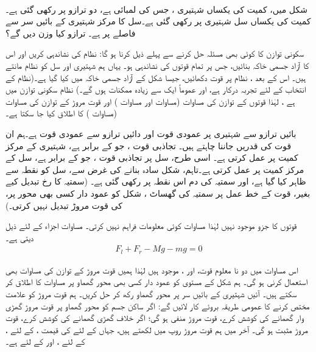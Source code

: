 \\
شکل  میں، کمیت  کی یکساں  شہتیری ، جس کی لمبائی  ہے، دو ترازو پر رکھی گئی ہے۔ کمیت   کی یکساں سل شہتیری پر رکھی گئی ہے۔سل کا مرکز شہتیری کے  بائیں سر سے   فاصلے پر ہے۔ ترازو کیا وزن دیں گے؟

سکونی توازن کا کوئی بھی مسئلہ حل کرنے سے پہلے ذیل کرنا ہو گا: نظام کی نشاندہی  کریں اور اس کا آزاد جسمی  خاکہ بنائیں، جس پر تمام قوتوں  کی نشاندہی   ہو۔ یہاں ہم شہتیری اور سل کو  نظام مانتے ہیں۔ اس کے بعد ، نظام پر قوت دکھائیں، جیسا شکل   کے آزاد جسمی خاکہ میں کیا گیا ہے۔(نظام کے  انتخاب کے لئے تجربہ درکار ہے، اور عموماً ایک سے زیادہ  ممکنات ہوں گے۔) نظام سکونی توازن میں ہے ، لہٰذا قوتوں کے توازن  کی مساوات  (مساوات  اور مساوات ) اور قوت مروڑ کے توازن کی مساوات (مساوات ) کا اطلاق کیا جا سکتا ہے۔

\quad
بائیں ترازو سے شہتیری پر عمودی قوت  اور  دائیں ترازو سے عمودی  قوت   ہے۔ہم ان قوت کی قدریں جاننا چاہتے ہیں۔ تجاذبی قوت ،    جو   کے برابر ہے، شہتیری  کے مرکز کمیت پر عمل کرتی ہے۔ اسی طرح،  سل  پر تجاذبی قوت ، جو  کے برابر ہے، سل کے مرکز کمیت پر عمل کرتی ہے۔تاہم،  شکل  سادہ بنانے کی غرض سے، سل کو نقطہ سے ظاہر کیا گیا ہے، اور سمتیہ   کی دم اس نقطہ پر رکھی گئی ہے۔ (سمتیہ   کا رخ تبدیل کیے بغیر،  قوت کے خط عمل پر سمتیہ   کی  گھساٹ ، شکل کو عمود دار کسی بھی محور پر،   کی قوت مروڑ تبدیل نہیں کرتی۔)

قوتوں کا  جزو موجود نہیں لہٰذا  مساوات    کوئی معلومات فراہم نہیں کرتی۔ مساوات       اجزاء کے لئے ذیل دیتی ہے۔
\begin{align}\label{مساوات_توازن_نمونی_الف}
F_l+F_r-Mg-mg=0
\end{align}

اس مساوات میں دو نا معلوم   قوت،  اور ،   موجود ہیں لہٰذا ہمیں قوت مروڑ کے توازن کی  مساوات  بھی  استعمال کرنی ہو گی۔ ہم شکل  کے مستوی کو عمود دار کسی بھی محور گھماو  پر مساوات کا اطلاق کر سکتے ہیں۔ آئیں شہتیری کے بائیں سر پر محور گھماو رکھ کر حل کریں۔ ہم قوت مروڑ کو علامت مختص کرنے کا عمومی  طریقہ بروئے کار لائیں گے: اگر ساکن جسم کو  محور گھماو پر قوت مروڑ گھڑی وار گھمانے کی کوشش کرے، قوت مروڑ منفی  ہو گی؛ اگر خلاف گھڑی گھمانے کی کوشش کرے، قوت مروڑ مثبت ہو گی۔ آخر میں ہم قوت مروڑ  روپ میں لکھتے ہیں، جہاں   کے لئے  کی قیمت ،  کے لئے ،  کے لئے ، اور  کے لئے  ہے۔

